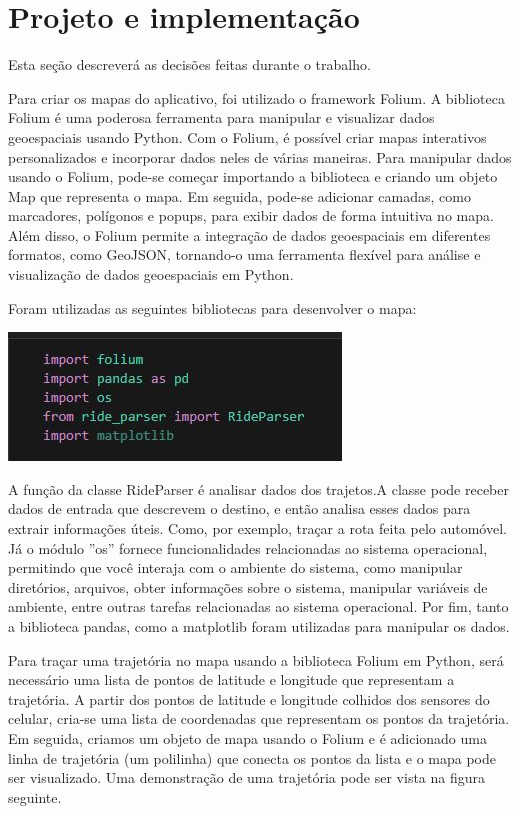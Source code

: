 \section{Projeto e implementação}
Esta seção descreverá as decisões feitas durante o trabalho.

Para criar os mapas do aplicativo, foi utilizado o framework Folium. A biblioteca Folium é uma poderosa ferramenta para manipular e visualizar dados geoespaciais usando Python. Com o Folium, é possível criar mapas interativos personalizados e incorporar dados neles de várias maneiras. Para manipular dados usando o Folium, pode-se começar importando a biblioteca e criando um objeto Map que representa o mapa. Em seguida, pode-se adicionar camadas, como marcadores, polígonos e popups, para exibir dados de forma intuitiva no mapa. Além disso, o Folium permite a integração de dados geoespaciais em diferentes formatos, como GeoJSON, tornando-o uma ferramenta flexível para análise e visualização de dados geoespaciais em Python.

Foram utilizadas as seguintes bibliotecas para desenvolver o mapa:
        \begin{center}
         \includegraphics[scale=0.8]         {figures/bibliotecas.JPG}
         \end{center}

A função da classe RideParser é analisar dados dos trajetos.A classe pode receber dados de entrada que descrevem o destino, e então analisa esses dados para extrair informações úteis. Como, por exemplo, traçar a rota feita pelo automóvel. Já o módulo 
''os'' fornece funcionalidades relacionadas ao sistema operacional, permitindo que você interaja com o ambiente do sistema, como manipular diretórios, arquivos, obter informações sobre o sistema, manipular variáveis de ambiente, entre outras tarefas relacionadas ao sistema operacional.
Por fim, tanto a biblioteca pandas, como a matplotlib foram utilizadas para manipular os dados.

Para traçar uma trajetória no mapa usando a biblioteca Folium em Python, será necessário uma lista de pontos de latitude e longitude que representam a trajetória. A partir dos pontos de latitude e longitude colhidos dos sensores do celular, cria-se uma lista de coordenadas que representam os pontos da trajetória. Em seguida, criamos um objeto de mapa usando o Folium e é adicionado uma linha de trajetória (um polilinha) que conecta os pontos da lista e o mapa pode ser visualizado. Uma demonstração de uma trajetória pode ser vista na figura seguinte.

